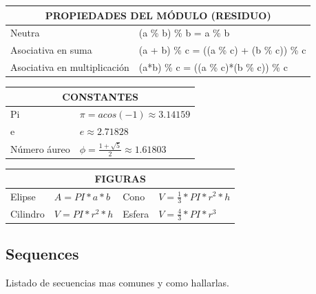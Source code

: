 \documentclass[10pt,landscape,twocolumn,letterpaper,twosided]{article}
\begin{document}
\begin{tabular}{|p{2.2cm}|p{8.2cm}|}
	\hline
	\multicolumn{2}{|c|}{PROPIEDADES DEL MÓDULO (RESIDUO)} \\  \hline
	Neutra & (a \% b) \% b = a \% b \\ \hline
	Asociativa en suma & (a + b) \% c = ((a \% c) + (b \% c)) \% c \\ \hline
	Asociativa en multiplicación &  (a*b) \% c = ((a \% c)*(b \% c)) \% c \\ \hline
\end{tabular}

\begin{tabular}{|p{2.2cm}|p{8.2cm}|}
	\hline
	\multicolumn{2}{|c|}{CONSTANTES} \\ \hline
	Pi & $\pi = acos(-1) \approx 3.14159$ \\ \hline
	e & $e \approx 2.71828$ \\ \hline
	Número áureo & $\phi = \displaystyle\frac{1 + \sqrt{5}}{2} \approx 1.61803$  \\ \hline
\end{tabular}

\begin{tabular}{|p{2.0cm}|p{2.8cm}|p{2.0cm}|p{2.8cm}|}
	\hline
	\multicolumn{4}{|c|}{FIGURAS} \\ \hline
	Elipse & $A = PI*a*b $ & Cono & $ V = \frac{1}{3} * PI*r^{2}*h$ \\ \hline
	Cilindro & $V = PI*r^{2}*h$ & Esfera & $V = \frac{4}{3}*PI*r^{3}$  \\ \hline
\end{tabular}



\subsection{Sequences}
Listado de secuencias mas comunes y como hallarlas.
\end{document}
